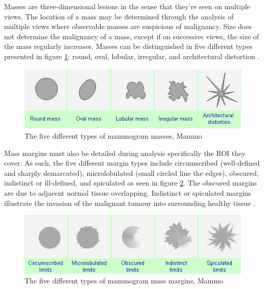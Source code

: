 	Masses are three-dimensional lesions in the sense that they're seen on multiple views. The location of a mass may be determined through the analysis of multiple views where observable masses are suspicious of malignancy. Size does not determine the malignancy of a mass, except if on successive views, the size of the mass regularly increases. Masses can be distinguished in five different types presented in figure \ref{fig:mammogramMassTypes}: round, oval, lobular, irregular, and architectural distortion  \cite{mammogramMass}.

\begin{figure}[h]
	\centering
  	\includegraphics[scale=0.8]{images/mammogramMassTypes.png}
	 \caption{The five different types of mammogram masses, Mammo}
  	\label{fig:mammogramMassTypes}
\end{figure}

	Mass margins must also be detailed during analysis specifically the ROI they cover. As such, the five different margin types include circumscribed (well-defined and sharply demarcated), microlobulated (small circled line the edges), obscured, indistinct or ill-defined, and spiculated as seen in figure \ref{fig:mammogramMargin}. The obscured margins are due to adjacent normal tissue overlapping. Indistinct or spiculated margins illustrate the invasion of the malignant tumour into surrounding healthy tissue \cite{mammogramMass}.

\begin{figure}[h]
	\centering
  	\includegraphics[scale=0.8]{images/mammogramMargin.png}
	 \caption{The five different types of mammogram mass margins, Mammo}
  	\label{fig:mammogramMargin}
\end{figure}

